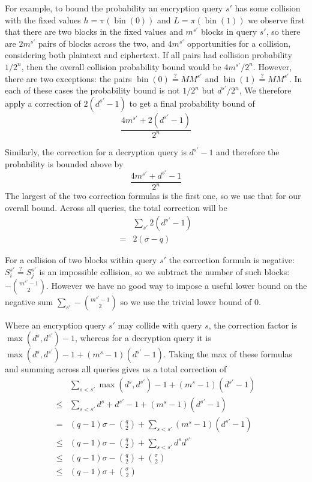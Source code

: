 \documentclass[letterpaper,11pt]{article}
\newcommand*{\MM}{\mathit{MM}}
\newcommand*{\qeq}{\stackrel{\text{?}}{=}}
\DeclareMathOperator{\fromint}{bin}
\begin{document}
For example,
to bound the probability an encryption query \(s'\)
has some collision with the fixed values
\(h = \pi(\fromint(0))\) and \(L = \pi(\fromint(1))\)
we observe first that
there are two blocks in the fixed values
and \(m^{s'}\) blocks in query \(s'\), so there are
\(2m^{s'}\) pairs of blocks across the two,
and \(4m^{s'}\) opportunities for a collision, 
considering both plaintext and ciphertext.
If all pairs had collision probability \(1/2^n\),
then the overall collision probability bound
would be \(4m^{s'}/2^n\). However, there are
two exceptions: the pairs
\(\fromint(0) \qeq \MM^{s'}\) and
\(\fromint(1) \qeq \MM^{s'}\). In each of these
cases the probability bound is not \(1/2^n\) but
\(d^{s'}/2^n\), We therefore apply a correction
of \(2(d^{s'} - 1)\) to get a final probability bound of
\begin{displaymath}
    \frac{4m^{s'} + 2(d^{s'} - 1)}{2^n}
\end{displaymath}

Similarly, the correction for a decryption query is
\(d^{s'} - 1\) and therefore  the probability 
is bounded above by
\begin{displaymath}
    \frac{4m^{s'} + d^{s'} -1}{2^n}
\end{displaymath}
The largest of the two correction formulas is
the first one, so we use that for our overall bound.
Across all queries, the total
correction will be
\begin{align*}
    &\sum_{s'} 2(d^{s'} - 1) \\
    = & 2(\sigma - q)
\end{align*}

For a collision of two blocks within query \(s'\)
the correction formula is negative:
\(S_i^{s'} \qeq S_j^{s'}\) is an impossible collision, 
so we subtract the number of such blocks:
\(-\binom{m^{s'} -1}{2}\). However we have no good way
to impose a useful lower bound on the negative sum
\(\sum_{s'}-\binom{m^{s'} -1}{2}\) so we use the
trivial lower bound of 0.

Where an encryption query \(s'\)
may collide with query \(s\), the correction factor is 
\(\max(d^s, d^{s'}) -1\), whereas for a decryption query
it is \(\max(d^s, d^{s'}) -1 + (m^s -1 )(d^{s'} -1)\).
Taking the max of these formulas and summing across
all queries gives us a total correction of
\begin{align*}
    &\sum_{s < s'} \max(d^s, d^{s'}) -1 + (m^s -1 )(d^{s'} -1)\\
    \leq & \sum_{s < s'} d^s + d^{s'} -1 + (m^s -1 )(d^{s'} -1)\\
    = & (q-1)\sigma - \binom{q}{2} + \sum_{s < s'} (m^s -1 )(d^{s'} -1) \\
    \leq & (q-1)\sigma - \binom{q}{2} + \sum_{s < s'} d^sd^{s'} \\
    \leq & (q-1)\sigma - \binom{q}{2} + \binom{\sigma}{2} \\
   \leq & (q-1)\sigma + \binom{\sigma}{2} \\
\end{align*}
\end{document}
